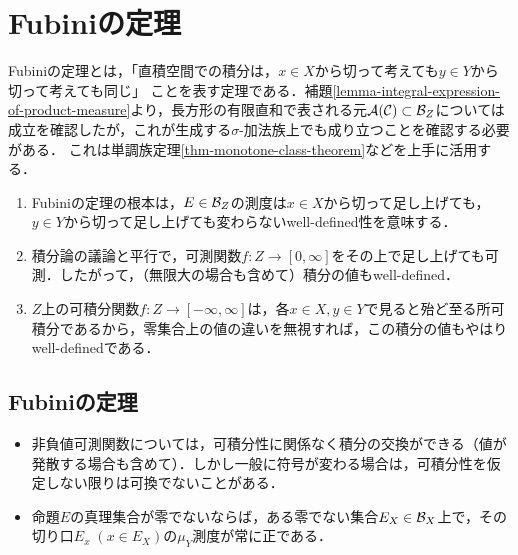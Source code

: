 \documentclass[uplatex, dvipdfmx]{jsreport}
\begin{document}
\section{Fubiniの定理}

\begin{tcolorbox}[colframe=ForestGreen, colback=ForestGreen!10!white,breakable,colbacktitle=ForestGreen!40!white,coltitle=black,fonttitle=\bfseries\sffamily,
title=積分の可換性]
    Fubiniの定理とは，「直積空間での積分は，$x\in X$から切って考えても$y\in Y$から切って考えても同じ」
    ことを表す定理である．補題\ref{lemma-integral-expression-of-product-measure}より，長方形の有限直和で表される元$\mathcal{A}(\mathcal{C})\subset\mathcal{B}_Z$については成立を確認したが，これが生成する$\sigma$-加法族上でも成り立つことを確認する必要がある．
    これは単調族定理\ref{thm-monotone-class-theorem}などを上手に活用する．
    \begin{enumerate}
        \item Fubiniの定理の根本は，$E\in\mathcal{B}_Z$の測度は$x\in X$から切って足し上げても，$y\in Y$から切って足し上げても変わらないwell-defined性を意味する．
        \item 積分論の議論と平行で，可測関数$f:Z\to[0,\infty]$をその上で足し上げても可測．したがって，（無限大の場合も含めて）積分の値もwell-defined．
        \item $Z$上の可積分関数$f:Z\to[-\infty,\infty]$は，各$x\in X,y\in Y$で見ると殆ど至る所可積分であるから，零集合上の値の違いを無視すれば，この積分の値もやはりwell-definedである．
    \end{enumerate}
\end{tcolorbox}

\subsection{Fubiniの定理}

\begin{tcolorbox}[colframe=ForestGreen, colback=ForestGreen!10!white,breakable,colbacktitle=ForestGreen!40!white,coltitle=black,fonttitle=\bfseries\sffamily,
title=]
    \begin{itemize}
        \item 非負値可測関数については，可積分性に関係なく積分の交換ができる（値が発散する場合も含めて）．しかし一般に符号が変わる場合は，可積分性を仮定しない限りは可換でないことがある．
        \item 命題$E$の真理集合が零でないならば，ある零でない集合$E_X\in\mathcal{B}_X$上で，その切り口$E_x\;(x\in E_X)$の$\mu_Y$測度が常に正である．
    \end{itemize}
\end{tcolorbox}
\end{document}
